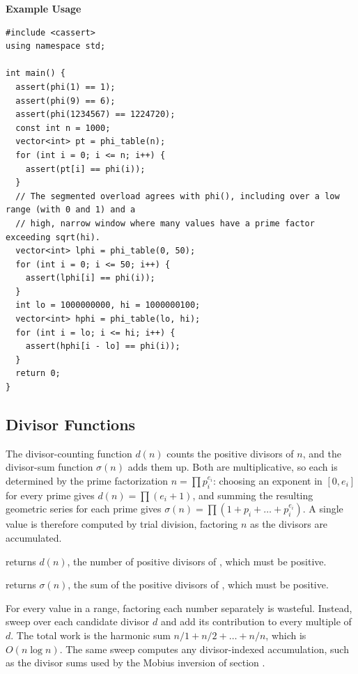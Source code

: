 \textbf{Example Usage}\par
\begin{lstlisting}[style=cpp]
#include <cassert>
using namespace std;

int main() {
  assert(phi(1) == 1);
  assert(phi(9) == 6);
  assert(phi(1234567) == 1224720);
  const int n = 1000;
  vector<int> pt = phi_table(n);
  for (int i = 0; i <= n; i++) {
    assert(pt[i] == phi(i));
  }
  // The segmented overload agrees with phi(), including over a low range (with 0 and 1) and a
  // high, narrow window where many values have a prime factor exceeding sqrt(hi).
  vector<int> lphi = phi_table(0, 50);
  for (int i = 0; i <= 50; i++) {
    assert(lphi[i] == phi(i));
  }
  int lo = 1000000000, hi = 1000000100;
  vector<int> hphi = phi_table(lo, hi);
  for (int i = lo; i <= hi; i++) {
    assert(hphi[i - lo] == phi(i));
  }
  return 0;
}
\end{lstlisting}
\subsection{Divisor Functions}
\label{sec:6.3.11}
The divisor-counting function $d(n)$ counts the positive divisors of $n$, and the divisor-sum function $\sigma(n)$ adds them up. Both are multiplicative, so each is determined by the prime factorization $n = \prod p_i^{e_i}$: choosing an exponent in $[0, e_i]$ for every prime gives $d(n) = \prod (e_i + 1)$, and summing the resulting geometric series for each prime gives $\sigma(n) = \prod (1 + p_i + \dots + p_i^{e_i})$. A single value is therefore computed by trial division, factoring $n$ as the divisors are accumulated.

\begin{compactitem}
  \item {} returns $d(n)$, the number of positive divisors of , which must be positive.
  \item {} returns $\sigma(n)$, the sum of the positive divisors of , which must be positive.
\end{compactitem}

For every value in a range, factoring each number separately is wasteful. Instead, sweep over each candidate divisor $d$ and add its contribution to every multiple of $d$. The total work is the harmonic sum $n/1 + n/2 + \dots + n/n$, which is $O(n \log n)$. The same sweep computes any divisor-indexed accumulation, such as the divisor sums used by the Mobius inversion of section .

